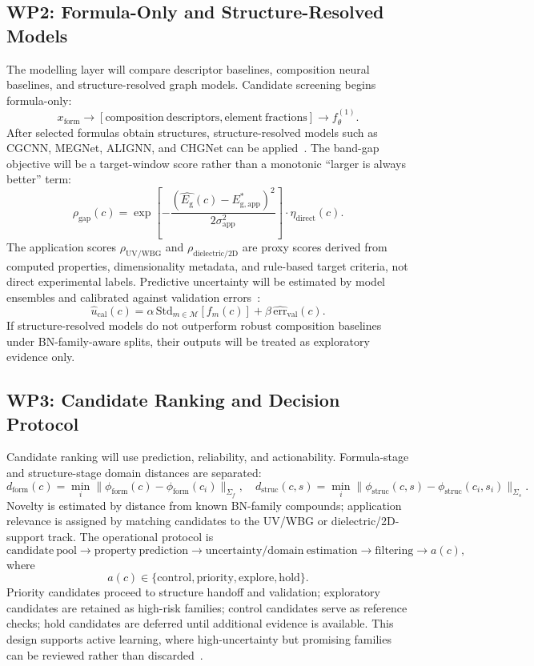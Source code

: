 \documentclass[10pt,a4paper]{article}
\newcommand{\eg}{E_{\mathrm{g}}}
\newcommand{\form}{x_{\mathrm{form}}}
\newcommand{\unc}{u}
\newcommand{\domainf}{d_{\mathrm{form}}}
\newcommand{\domains}{d_{\mathrm{struc}}}
\newcommand{\gapscore}{\rho_{\mathrm{gap}}}
\newcommand{\uvscore}{\rho_{\mathrm{UV/WBG}}}
\newcommand{\dielscore}{\rho_{\mathrm{dielectric/2D}}}
\begin{document}
\subsection{WP2: Formula-Only and Structure-Resolved Models}
The modelling layer will compare descriptor baselines, composition neural baselines, and structure-resolved graph models. Candidate screening begins formula-only:
\[
  \form\rightarrow
  [\mathrm{composition\ descriptors},\mathrm{element\ fractions}]
  \rightarrow f_{\theta}^{(1)}.
\]
After selected formulas obtain structures, structure-resolved models such as CGCNN, MEGNet, ALIGNN, and CHGNet can be applied~\cite{xie2018_cgcnn,chen2019_megnet,choudhary2021_alignn,deng2023_chgnet}. The band-gap objective will be a target-window score rather than a monotonic ``larger is always better'' term:
\[
  \gapscore(c)=
  \exp\!\left[-\frac{(\hat{\eg}(c)-E^*_{\mathrm{g,app}})^2}{2\sigma_{\mathrm{app}}^2}\right]
  \cdot \eta_{\mathrm{direct}}(c).
\]
The application scores $\uvscore$ and $\dielscore$ are proxy scores derived from computed properties, dimensionality metadata, and rule-based target criteria, not direct experimental labels. Predictive uncertainty will be estimated by model ensembles and calibrated against validation errors~\cite{gal2016_dropout,lakshminarayanan2017_ensembles}:
\[
  \hat{\unc}_{\mathrm{cal}}(c)=
  \alpha\,\mathrm{Std}_{m\in\mathcal{M}}[f_m(c)]
  +\beta\,\widehat{\mathrm{err}}_{\mathrm{val}}(c).
\]
If structure-resolved models do not outperform robust composition baselines under BN-family-aware splits, their outputs will be treated as exploratory evidence only.

\subsection{WP3: Candidate Ranking and Decision Protocol}
Candidate ranking will use prediction, reliability, and actionability. Formula-stage and structure-stage domain distances are separated:
\[
  \domainf(c)=\min_i\|\phi_{\mathrm{form}}(c)-\phi_{\mathrm{form}}(c_i)\|_{\Sigma_f},
  \quad
  \domains(c,s)=\min_i\|\phi_{\mathrm{struc}}(c,s)-\phi_{\mathrm{struc}}(c_i,s_i)\|_{\Sigma_s}.
\]
Novelty is estimated by distance from known BN-family compounds; application relevance is assigned by matching candidates to the UV/WBG or dielectric/2D-support track. The operational protocol is
\[
  \mathrm{candidate\ pool}\rightarrow\mathrm{property\ prediction}\rightarrow
  \mathrm{uncertainty/domain\ estimation}\rightarrow\mathrm{filtering}\rightarrow
  a(c),
\]
where
\[
  a(c)\in\{\mathrm{control},\mathrm{priority},\mathrm{explore},\mathrm{hold}\}.
\]
Priority candidates proceed to structure handoff and validation; exploratory candidates are retained as high-risk families; control candidates serve as reference checks; hold candidates are deferred until additional evidence is available. This design supports active learning, where high-uncertainty but promising families can be reviewed rather than discarded~\cite{lookman2019_active}.
\end{document}
